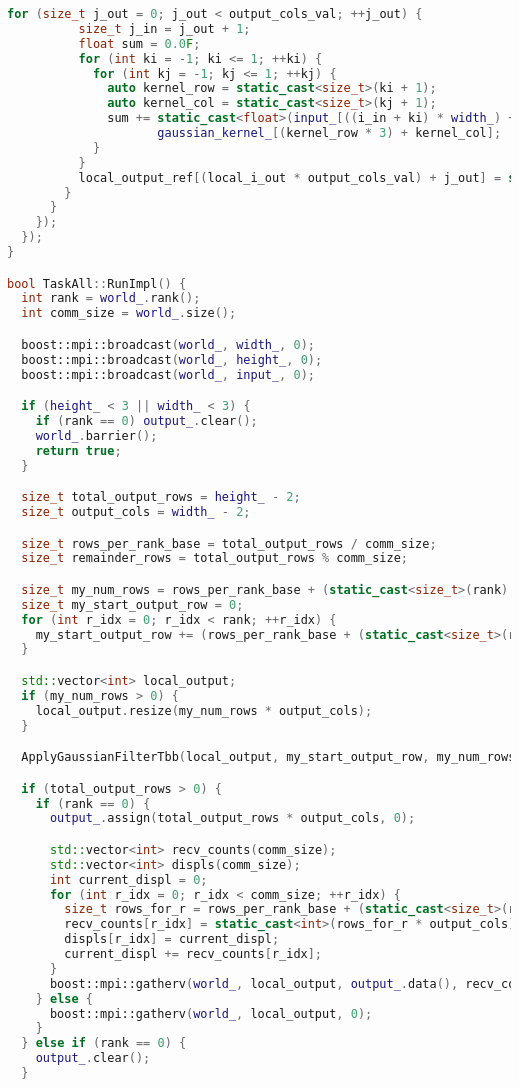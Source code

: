 \documentclass[12pt,a4paper]{extarticle}
\begin{document}
\begin{lstlisting}[language=C++]
        for (size_t j_out = 0; j_out < output_cols_val; ++j_out) {
          size_t j_in = j_out + 1;
          float sum = 0.0F;
          for (int ki = -1; ki <= 1; ++ki) {
            for (int kj = -1; kj <= 1; ++kj) {
              auto kernel_row = static_cast<size_t>(ki + 1);
              auto kernel_col = static_cast<size_t>(kj + 1);
              sum += static_cast<float>(input_[((i_in + ki) * width_) + (j_in + kj)]) *
                     gaussian_kernel_[(kernel_row * 3) + kernel_col];
            }
          }
          local_output_ref[(local_i_out * output_cols_val) + j_out] = static_cast<int>(sum);
        }
      }
    });
  });
}

bool TaskAll::RunImpl() {
  int rank = world_.rank();
  int comm_size = world_.size();

  boost::mpi::broadcast(world_, width_, 0);
  boost::mpi::broadcast(world_, height_, 0);
  boost::mpi::broadcast(world_, input_, 0);

  if (height_ < 3 || width_ < 3) {
    if (rank == 0) output_.clear();
    world_.barrier();
    return true;
  }

  size_t total_output_rows = height_ - 2;
  size_t output_cols = width_ - 2;

  size_t rows_per_rank_base = total_output_rows / comm_size;
  size_t remainder_rows = total_output_rows % comm_size;

  size_t my_num_rows = rows_per_rank_base + (static_cast<size_t>(rank) < remainder_rows ? 1 : 0);
  size_t my_start_output_row = 0;
  for (int r_idx = 0; r_idx < rank; ++r_idx) {
    my_start_output_row += (rows_per_rank_base + (static_cast<size_t>(r_idx) < remainder_rows ? 1 : 0));
  }

  std::vector<int> local_output;
  if (my_num_rows > 0) {
    local_output.resize(my_num_rows * output_cols);
  }

  ApplyGaussianFilterTbb(local_output, my_start_output_row, my_num_rows, output_cols);

  if (total_output_rows > 0) {
    if (rank == 0) {
      output_.assign(total_output_rows * output_cols, 0);

      std::vector<int> recv_counts(comm_size);
      std::vector<int> displs(comm_size);
      int current_displ = 0;
      for (int r_idx = 0; r_idx < comm_size; ++r_idx) {
        size_t rows_for_r = rows_per_rank_base + (static_cast<size_t>(r_idx) < remainder_rows ? 1 : 0);
        recv_counts[r_idx] = static_cast<int>(rows_for_r * output_cols);
        displs[r_idx] = current_displ;
        current_displ += recv_counts[r_idx];
      }
      boost::mpi::gatherv(world_, local_output, output_.data(), recv_counts, displs, 0);
    } else {
      boost::mpi::gatherv(world_, local_output, 0);
    }
  } else if (rank == 0) {
    output_.clear();
  }


\end{lstlisting}
\end{document}
